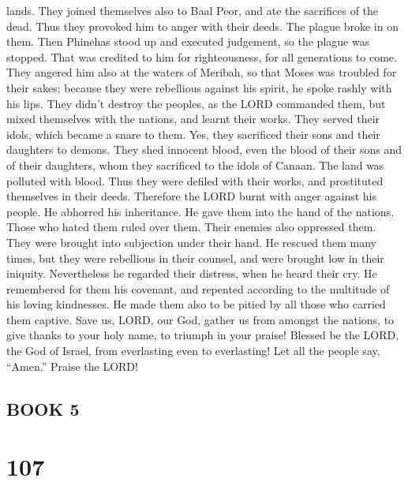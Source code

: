 lands.  They joined themselves also to Baal Peor, and ate
the sacrifices of the dead.  Thus they provoked him to
anger with their deeds. The plague broke in on them.  Then
Phinehas stood up and executed judgement, so the plague was stopped.
 That was credited to him for righteousness, for all
generations to come.  They angered him also at the waters
of Meribah, so that Moses was troubled for their sakes; 
because they were rebellious against his spirit, he spoke rashly with
his lips.  They didn't destroy the peoples, as the LORD
commanded them,  but mixed themselves with the nations, and
learnt their works.  They served their idols, which became
a snare to them.  Yes, they sacrificed their sons and their
daughters to demons.  They shed innocent blood, even the
blood of their sons and of their daughters, whom they sacrificed to the
idols of Canaan. The land was polluted with blood.  Thus
they were defiled with their works, and prostituted themselves in their
deeds.  Therefore the LORD burnt with anger against his
people. He abhorred his inheritance.  He gave them into the
hand of the nations. Those who hated them ruled over them. 
Their enemies also oppressed them. They were brought into subjection
under their hand.  He rescued them many times, but they
were rebellious in their counsel, and were brought low in their
iniquity.  Nevertheless he regarded their distress, when he
heard their cry.  He remembered for them his covenant, and
repented according to the multitude of his loving kindnesses.
 He made them also to be pitied by all those who carried
them captive.  Save us, LORD, our God, gather us from
amongst the nations, to give thanks to your holy name, to triumph in
your praise!  Blessed be the LORD, the God of Israel, from
everlasting even to everlasting! Let all the people say, ``Amen.''
Praise the LORD!

\hypertarget{book-5}{%
\subsection{BOOK 5}\label{book-5}}

\hypertarget{section-97}{%
\section{107}\label{section-97}}

